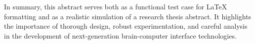 In summary, this abstract serves both as a functional test case for {\LaTeX} formatting and as a realistic simulation of a research thesis abstract. It highlights the importance of thorough design, robust experimentation, and careful analysis in the development of next-generation brain-computer interface technologies.


